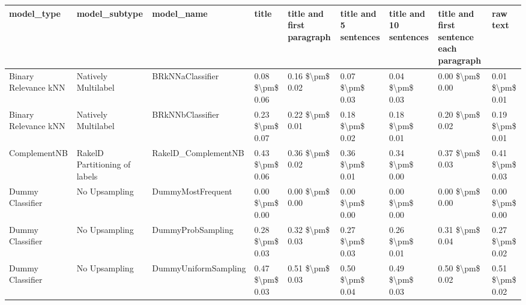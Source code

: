 \begin{tabular}{lllllllll}
\toprule
                     model\_type &                 model\_subtype &                                   model\_name &               title & title and first paragraph & title and 5 sentences & title and 10 sentences & title and first sentence each paragraph &        raw text \\
\midrule
           Binary Relevance kNN &           Natively Multilabel &                             BRkNNaClassifier &     0.08 \$\textbackslash pm\$ 0.06 &           0.16 \$\textbackslash pm\$ 0.02 &       0.07 \$\textbackslash pm\$ 0.03 &        0.04 \$\textbackslash pm\$ 0.03 &                         0.00 \$\textbackslash pm\$ 0.00 & 0.01 \$\textbackslash pm\$ 0.01 \\
           Binary Relevance kNN &           Natively Multilabel &                             BRkNNbClassifier &     0.23 \$\textbackslash pm\$ 0.07 &           0.22 \$\textbackslash pm\$ 0.01 &       0.18 \$\textbackslash pm\$ 0.02 &        0.18 \$\textbackslash pm\$ 0.01 &                         0.20 \$\textbackslash pm\$ 0.02 & 0.19 \$\textbackslash pm\$ 0.01 \\
                   ComplementNB & RakelD Partitioning of labels &                          RakelD\_ComplementNB &     0.43 \$\textbackslash pm\$ 0.06 &           0.36 \$\textbackslash pm\$ 0.02 &       0.36 \$\textbackslash pm\$ 0.01 &        0.34 \$\textbackslash pm\$ 0.00 &                         0.37 \$\textbackslash pm\$ 0.03 & 0.41 \$\textbackslash pm\$ 0.03 \\
               Dummy Classifier &                 No Upsampling &                            DummyMostFrequent &     0.00 \$\textbackslash pm\$ 0.00 &           0.00 \$\textbackslash pm\$ 0.00 &       0.00 \$\textbackslash pm\$ 0.00 &        0.00 \$\textbackslash pm\$ 0.00 &                         0.00 \$\textbackslash pm\$ 0.00 & 0.00 \$\textbackslash pm\$ 0.00 \\
               Dummy Classifier &                 No Upsampling &                            DummyProbSampling &     0.28 \$\textbackslash pm\$ 0.03 &           0.32 \$\textbackslash pm\$ 0.03 &       0.27 \$\textbackslash pm\$ 0.03 &        0.26 \$\textbackslash pm\$ 0.01 &                         0.31 \$\textbackslash pm\$ 0.04 & 0.27 \$\textbackslash pm\$ 0.02 \\
               Dummy Classifier &                 No Upsampling &                         DummyUniformSampling &     0.47 \$\textbackslash pm\$ 0.03 &           0.51 \$\textbackslash pm\$ 0.03 &       0.50 \$\textbackslash pm\$ 0.04 &        0.49 \$\textbackslash pm\$ 0.03 &                         0.50 \$\textbackslash pm\$ 0.02 & 0.51 \$\textbackslash pm\$ 0.02 \\

\end{tabular}
